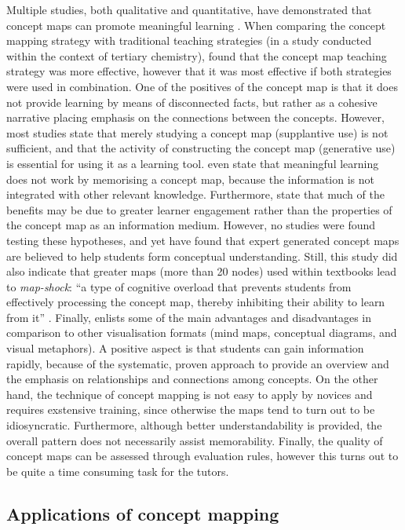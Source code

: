 Multiple studies, both qualitative and quantitative, have demonstrated that concept maps can promote meaningful learning \cite{canas, hwang2, nesbit2, subramaniam}. When comparing the concept mapping strategy with traditional teaching strategies (in a study conducted within the context of tertiary chemistry),  found that the concept map teaching strategy was more effective, however that it was most effective if both strategies were used in combination. One of the positives of the concept map is that it does not provide learning by means of disconnected facts, but rather as a cohesive narrative placing emphasis on the connections between the concepts. However, most studies state that merely studying a concept map (supplantive use) is not sufficient, and that the activity of constructing the concept map (generative use) is essential for using it as a learning tool.  even state that meaningful learning does not work by memorising a concept map, because the information is not integrated with other relevant knowledge. Furthermore,  state that much of the benefits may be due to greater learner engagement rather than the properties of the concept map as an information medium. However, no studies were found testing these hypotheses, and yet  have found that expert generated concept maps are believed to help students form conceptual understanding. Still, this study did also indicate that greater maps (more than 20 nodes) used within textbooks lead to \emph{map-shock}: ``a type of cognitive overload that prevents students from effectively processing the concept map, thereby inhibiting their ability to learn from it'' \cite[p.~3]{moore}. Finally,  enlists some of the main advantages and disadvantages in comparison to other visualisation formats (mind maps, conceptual diagrams, and visual metaphors). A positive aspect is that students can gain information rapidly, because of the systematic, proven approach to provide an overview and the emphasis on relationships and connections among concepts. On the other hand, the technique of concept mapping is not easy to apply by novices and requires exstensive training, since otherwise the maps tend to turn out to be idiosyncratic. Furthermore, although better understandability is provided, the overall pattern does not necessarily assist memorability. Finally, the quality of concept maps can be assessed through evaluation rules, however this turns out to be quite a time consuming task for the tutors.


\subsection{Applications of concept mapping}

